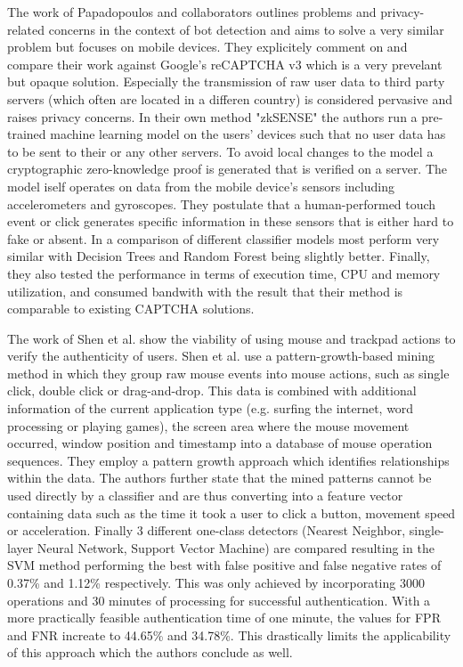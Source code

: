 \documentclass[
    fontsize=12pt,
    headings=small,
    parskip=half,           %
    bibliography=totoc,
    numbers=noenddot,       %
    open=any,               %
    final,                   %
    table
]{scrreprt}
\begin{document}
The work of Papadopoulos and collaborators \cite{PETS2021} outlines problems and privacy-related concerns in the context of bot detection and aims to solve a very similar problem but focuses on mobile devices. They explicitely comment on and compare their work against Google's reCAPTCHA v3 \cite{RECPATCHA_V3} which is a very prevelant but opaque solution. Especially the transmission of raw user data to third party servers (which often are located in a differen country) is considered pervasive and raises privacy concerns. In their own method "zkSENSE" the authors run a pre-trained machine learning model on the users' devices such that no user data has to be sent to their or any other servers. To avoid local changes to the model a cryptographic zero-knowledge proof is generated that is verified on a server. The model iself operates on data from the mobile device's sensors including accelerometers and gyroscopes. They postulate that a human-performed touch event or click generates specific information in these sensors that is either hard to fake or absent. In a comparison of different classifier models most perform very similar with Decision Trees and Random Forest being slightly better. Finally, they also tested the performance in terms of execution time, CPU and memory utilization, and consumed bandwith with the result that their method is comparable to existing CAPTCHA solutions.


The work of Shen et al. \cite{6263955} show the viability of using mouse and trackpad actions to verify the authenticity of users. Shen et al. use a pattern-growth-based mining method in which they group raw mouse events into mouse actions, such as single click, double click or drag-and-drop. This data is combined with additional information of the current application type (e.g. surfing the internet, word processing or playing games), the screen area where the mouse movement occurred, window position and timestamp into a database of mouse operation sequences. They employ a pattern growth approach which identifies relationships within the data. The authors further state that the mined patterns cannot be used directly by a classifier and are thus converting into a feature vector containing data such as the time it took a user to click a button, movement speed or acceleration. Finally 3 different one-class detectors (Nearest Neighbor, single-layer Neural Network, Support Vector Machine) are compared resulting in the SVM method performing the best with false positive and false negative rates of 0.37\% and 1.12\% respectively. This was only achieved by incorporating 3000 operations and 30 minutes of processing for successful authentication. With a more practically feasible authentication time of one minute, the values for FPR and FNR increate to 44.65\% and 34.78\%. This drastically limits the applicability of this approach which the authors conclude as well.
\end{document}
